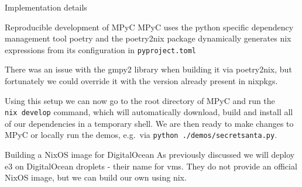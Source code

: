 \begin{frame}[fragile]{Implementation details}
\begin{block}{Reproducible development of MPyC}
MPyC uses the python specific dependency management tool
poetry\autocite{poetryDocs} and the poetry2nix package dynamically
generates nix expressions from its configuration in
\texttt{pyproject.toml}

\begin{Shaded}
\begin{Highlighting}[]
\KeywordTok{[}\KeywordTok{]}
 \OperatorTok{=} 
 \OperatorTok{=} 
 \OperatorTok{=} 
 \OperatorTok{=} \OperatorTok{[}\OperatorTok{]}
 \OperatorTok{=} 
 \OperatorTok{=} \OperatorTok{[\{}\OperatorTok{ =} \OperatorTok{\}]}

\KeywordTok{[}\KeywordTok{]}
 \OperatorTok{=} 
 \OperatorTok{=} 
 \OperatorTok{=} 
 \OperatorTok{=} 

\KeywordTok{[}\KeywordTok{]}
 \OperatorTok{=} \OperatorTok{[}\OperatorTok{]}
 \OperatorTok{=} 
\end{Highlighting}
\end{Shaded}

There was an issue with the gmpy2 library when building it via
poetry2nix, but fortunately we could override it with the version
already present in nixpkgs.

Using this setup we can now go to the root directory of MPyC and run the
\texttt{nix\ develop} command, which will automatically download, build
and install all of our dependencies in a temporary shell. We are then
ready to make changes to MPyC or locally run the demos, e.g.~via
\texttt{python\ ./demos/secretsanta.py}.
\end{block}

\begin{block}{Building a NixOS image for DigitalOcean}
\protect\hypertarget{building-a-nixos-image-for-digitalocean}{}
As previously discussed we will deploy \gls{e3} on DigitalOcean droplets
- their name for \glspl{vm}. They do not provide an official NixOS
image, but we can build our own using nix.


\end{block}
\end{frame}
